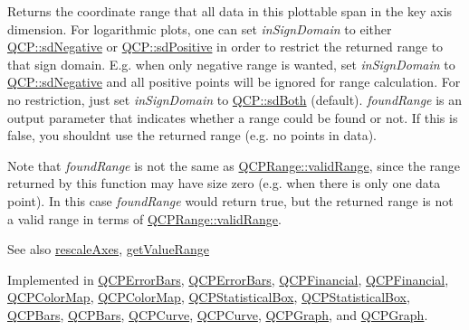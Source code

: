 Returns the coordinate range that all data in this plottable span in the key axis dimension. For logarithmic plots, one can set {\itshape in\+Sign\+Domain} to either \hyperlink{namespace_q_c_p_afd50e7cf431af385614987d8553ff8a9a0b464fa3135be2808909739a969193c9}{Q\+C\+P\+::sd\+Negative} or \hyperlink{namespace_q_c_p_afd50e7cf431af385614987d8553ff8a9a23362334a52289677a51526a9b68db6c}{Q\+C\+P\+::sd\+Positive} in order to restrict the returned range to that sign domain. E.\+g. when only negative range is wanted, set {\itshape in\+Sign\+Domain} to \hyperlink{namespace_q_c_p_afd50e7cf431af385614987d8553ff8a9a0b464fa3135be2808909739a969193c9}{Q\+C\+P\+::sd\+Negative} and all positive points will be ignored for range calculation. For no restriction, just set {\itshape in\+Sign\+Domain} to \hyperlink{namespace_q_c_p_afd50e7cf431af385614987d8553ff8a9a3dee7e9cd2fedce9253b83e172626a6c}{Q\+C\+P\+::sd\+Both} (default). {\itshape found\+Range} is an output parameter that indicates whether a range could be found or not. If this is false, you shouldn\textquotesingle{}t use the returned range (e.\+g. no points in data).

Note that {\itshape found\+Range} is not the same as \hyperlink{class_q_c_p_range_ab38bd4841c77c7bb86c9eea0f142dcc0}{Q\+C\+P\+Range\+::valid\+Range}, since the range returned by this function may have size zero (e.\+g. when there is only one data point). In this case {\itshape found\+Range} would return true, but the returned range is not a valid range in terms of \hyperlink{class_q_c_p_range_ab38bd4841c77c7bb86c9eea0f142dcc0}{Q\+C\+P\+Range\+::valid\+Range}.

\begin{DoxySeeAlso}{See also}
\hyperlink{class_q_c_p_abstract_plottable_a1491c4a606bccd2d09e65e11b79eb882}{rescale\+Axes}, \hyperlink{class_q_c_p_abstract_plottable_a4de773988b21ed090fddd27c6a3a3dcb}{get\+Value\+Range} 
\end{DoxySeeAlso}


Implemented in \hyperlink{class_q_c_p_error_bars_a6cac828a430d66ac77a167549d01d212}{Q\+C\+P\+Error\+Bars}, \hyperlink{class_q_c_p_error_bars_aa8850872dd67af338e612427ec595a13}{Q\+C\+P\+Error\+Bars}, \hyperlink{class_q_c_p_financial_a15d68fb257113fef697356d65fa76559}{Q\+C\+P\+Financial}, \hyperlink{class_q_c_p_financial_abb56add5757f53239d8bef462bd53578}{Q\+C\+P\+Financial}, \hyperlink{class_q_c_p_color_map_a985861974560f950af6cb7fae8c46267}{Q\+C\+P\+Color\+Map}, \hyperlink{class_q_c_p_color_map_a7c87826c64551d5f2ade620f12599e45}{Q\+C\+P\+Color\+Map}, \hyperlink{class_q_c_p_statistical_box_a77d2d13301dfe60c13adfaa17fc1802f}{Q\+C\+P\+Statistical\+Box}, \hyperlink{class_q_c_p_statistical_box_ae44dd2e135ebf2a53eb6e4bfe7343211}{Q\+C\+P\+Statistical\+Box}, \hyperlink{class_q_c_p_bars_ac5a3854774d9d9cd129b1eae1426de2d}{Q\+C\+P\+Bars}, \hyperlink{class_q_c_p_bars_a3cc3cefe0a486f6cf5793b0bdc7b58cc}{Q\+C\+P\+Bars}, \hyperlink{class_q_c_p_curve_a22d09087f78f254731197cc0b8783299}{Q\+C\+P\+Curve}, \hyperlink{class_q_c_p_curve_a83e4b33a6f949211b0191168f8448d0b}{Q\+C\+P\+Curve}, \hyperlink{class_q_c_p_graph_aac47c6189e3aea46ea46939e5d14796c}{Q\+C\+P\+Graph}, and \hyperlink{class_q_c_p_graph_a7b332af5ead6a278f4a6a065febeed24}{Q\+C\+P\+Graph}.

